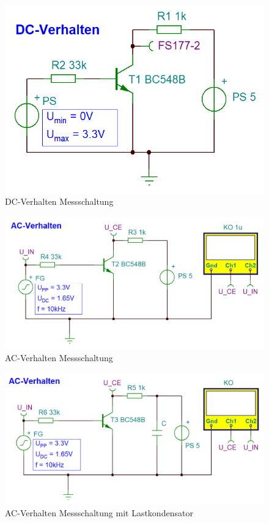 \documentclass[../main.tex]{subfiles}
\begin{document}
\begin{figure}[h]
    \centering
    \includegraphics[scale=0.35]{assets/task3_square/messschaltung_task3_DC.PNG}
    \caption{DC-Verhalten Messschaltung}
    \label{fig:circuit_voltage_stabilization_dc}
\end{figure}

\begin{figure}[h]
    \centering
    \includegraphics[scale=0.35]{assets/task3_square/messschaltung_task3_AC.PNG}
    \caption{AC-Verhalten Messschaltung}
    \label{fig:circuit_voltage_stabilization_ac}
\end{figure}

\begin{figure}[h]
    \centering
    \includegraphics[scale=0.35]{assets/task3_square/messschaltung_task3_AC_capacitor.PNG}
    \caption{AC-Verhalten Messschaltung mit Lastkondensator}
    \label{fig:circuit_voltage_stabilization_ac_cap}
\end{figure}
\end{document}

